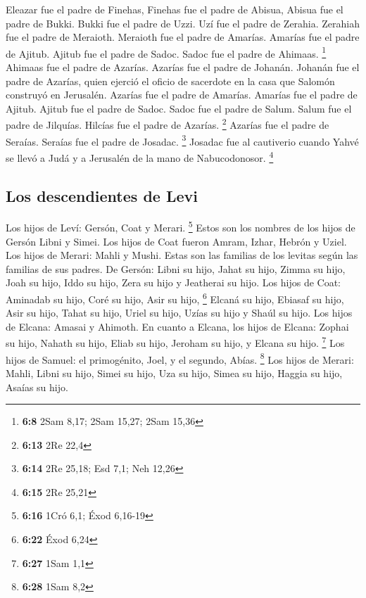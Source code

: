  Eleazar fue el padre de Finehas, Finehas fue el padre de
Abisua,  Abisua fue el padre de Bukki. Bukki fue el padre
de Uzzi.  Uzí fue el padre de Zerahia. Zerahiah fue el
padre de Meraioth.  Meraioth fue el padre de Amarías.
Amarías fue el padre de Ajitub.  Ajitub fue el padre de
Sadoc. Sadoc fue el padre de Ahimaas. \footnote{\textbf{6:8} 2Sam 8,17;
  2Sam 15,27; 2Sam 15,36}  Ahimaas fue el padre de
Azarías. Azarías fue el padre de Johanán.  Johanán fue el
padre de Azarías, quien ejerció el oficio de sacerdote en la casa que
Salomón construyó en Jerusalén.  Azarías fue el padre de
Amarías. Amarías fue el padre de Ajitub.  Ajitub fue el
padre de Sadoc. Sadoc fue el padre de Salum.  Salum fue
el padre de Jilquías. Hilcías fue el padre de Azarías. \footnote{\textbf{6:13}
  2Re 22,4}  Azarías fue el padre de Seraías. Seraías fue
el padre de Josadac. \footnote{\textbf{6:14} 2Re 25,18; Esd 7,1; Neh
  12,26}  Josadac fue al cautiverio cuando Yahvé se llevó
a Judá y a Jerusalén de la mano de Nabucodonosor. \footnote{\textbf{6:15}
  2Re 25,21}

\hypertarget{los-descendientes-de-levi}{%
\subsection{Los descendientes de Levi}\label{los-descendientes-de-levi}}

 Los hijos de Leví: Gersón, Coat y Merari. \footnote{\textbf{6:16}
  1Cró 6,1; Éxod 6,16-19}  Estos son los nombres de los
hijos de Gersón Libni y Simei.  Los hijos de Coat fueron
Amram, Izhar, Hebrón y Uziel.  Los hijos de Merari: Mahli
y Mushi. Estas son las familias de los levitas según las familias de sus
padres.  De Gersón: Libni su hijo, Jahat su hijo, Zimma
su hijo,  Joah su hijo, Iddo su hijo, Zera su hijo y
Jeatherai su hijo.  Los hijos de Coat: Aminadab su hijo,
Coré su hijo, Asir su hijo, \footnote{\textbf{6:22} Éxod 6,24}
 Elcaná su hijo, Ebiasaf su hijo, Asir su hijo,
 Tahat su hijo, Uriel su hijo, Uzías su hijo y Shaúl su
hijo.  Los hijos de Elcana: Amasai y Ahimoth.
 En cuanto a Elcana, los hijos de Elcana: Zophai su hijo,
Nahath su hijo,  Eliab su hijo, Jeroham su hijo, y Elcana
su hijo. \footnote{\textbf{6:27} 1Sam 1,1}  Los hijos de
Samuel: el primogénito, Joel, y el segundo, Abías. \footnote{\textbf{6:28}
  1Sam 8,2}  Los hijos de Merari: Mahli, Libni su hijo,
Simei su hijo, Uza su hijo,  Simea su hijo, Haggia su
hijo, Asaías su hijo.

